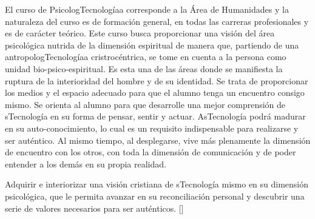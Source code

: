 \begin{syllabus}


\begin{justification}
El curso de PsicologTecnologíaa corresponde a la Área de Humanidades y la naturaleza del curso es de formación general, en todas las carreras profesionales y es de carácter teórico.
Este curso busca proporcionar una visión del área psicológica nutrida de la dimensión espiritual de manera que, partiendo de una antropologTecnologíaa cristrocéntrica, se tome en cuenta a la persona como unidad bio-psico-espiritual. Es esta una de las áreas donde se manifiesta la ruptura de la interioridad del hombre y de su identidad.
Se trata de proporcionar los medios y el espacio adecuado para que el alumno tenga un encuentro consigo mismo. Se orienta al alumno para que desarrolle una mejor comprensión de sTecnología en su forma de pensar, sentir y actuar. AsTecnología podrá madurar en su auto-conocimiento, lo cual es un requisito indispensable para realizarse y ser auténtico. Al mismo tiempo, al desplegarse, vive más plenamente la dimensión de encuentro con los otros, con toda la dimensión de comunicación y de poder entender a los demás en su propia realidad.
\end{justification}

\begin{goals}
\item Adquirir e interiorizar una visión cristiana de sTecnología mismo en su dimensión psicológica, que le permita avanzar en su reconciliación personal y descubrir una serie de valores necesarios para ser auténticos. [\Usage]
\end{goals}

\begin{outcomes}
    \item {}
    \item {}
    \item {}
    \item {}
\end{outcomes}

\begin{competences}
    \item {}
    \item {}
    \item {} 
    \item {}
\end{competences}


\end{syllabus}
